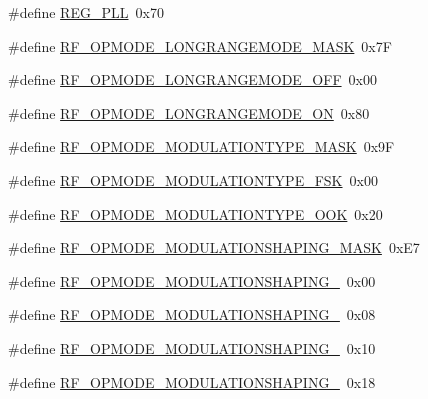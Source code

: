 \begin{DoxyCompactItemize}
\#define \mbox{\hyperlink{sx1276_regs-_fsk_8h_aa5110ddd4aaa720908be259b5a4af489}{R\+E\+G\+\_\+\+P\+LL}}~0x70
\item 
\#define \mbox{\hyperlink{sx1276_regs-_fsk_8h_afd99a116c626b5579054d37c640e175a}{R\+F\+\_\+\+O\+P\+M\+O\+D\+E\+\_\+\+L\+O\+N\+G\+R\+A\+N\+G\+E\+M\+O\+D\+E\+\_\+\+M\+A\+SK}}~0x7F
\item 
\#define \mbox{\hyperlink{sx1276_regs-_fsk_8h_a856e634d884238e300fdf87a2557d670}{R\+F\+\_\+\+O\+P\+M\+O\+D\+E\+\_\+\+L\+O\+N\+G\+R\+A\+N\+G\+E\+M\+O\+D\+E\+\_\+\+O\+FF}}~0x00
\item 
\#define \mbox{\hyperlink{sx1276_regs-_fsk_8h_a1775751bd57cbba5d752ebf2e03c6e1b}{R\+F\+\_\+\+O\+P\+M\+O\+D\+E\+\_\+\+L\+O\+N\+G\+R\+A\+N\+G\+E\+M\+O\+D\+E\+\_\+\+ON}}~0x80
\item 
\#define \mbox{\hyperlink{sx1276_regs-_fsk_8h_a9b3d405d931ad505308b89d2fa029dbb}{R\+F\+\_\+\+O\+P\+M\+O\+D\+E\+\_\+\+M\+O\+D\+U\+L\+A\+T\+I\+O\+N\+T\+Y\+P\+E\+\_\+\+M\+A\+SK}}~0x9F
\item 
\#define \mbox{\hyperlink{sx1276_regs-_fsk_8h_af4f3f4b19fd43491f270fcee634edd13}{R\+F\+\_\+\+O\+P\+M\+O\+D\+E\+\_\+\+M\+O\+D\+U\+L\+A\+T\+I\+O\+N\+T\+Y\+P\+E\+\_\+\+F\+SK}}~0x00
\item 
\#define \mbox{\hyperlink{sx1276_regs-_fsk_8h_af6fe2f62d8ec55fcf40c73ae24bc54ae}{R\+F\+\_\+\+O\+P\+M\+O\+D\+E\+\_\+\+M\+O\+D\+U\+L\+A\+T\+I\+O\+N\+T\+Y\+P\+E\+\_\+\+O\+OK}}~0x20
\item 
\#define \mbox{\hyperlink{sx1276_regs-_fsk_8h_a1b851bfa8cc641cd5a2a0805df4f4762}{R\+F\+\_\+\+O\+P\+M\+O\+D\+E\+\_\+\+M\+O\+D\+U\+L\+A\+T\+I\+O\+N\+S\+H\+A\+P\+I\+N\+G\+\_\+\+M\+A\+SK}}~0x\+E7
\item 
\#define \mbox{\hyperlink{sx1276_regs-_fsk_8h_a1a589ce58d8c5fb2da244d4829d11a3f}{R\+F\+\_\+\+O\+P\+M\+O\+D\+E\+\_\+\+M\+O\+D\+U\+L\+A\+T\+I\+O\+N\+S\+H\+A\+P\+I\+N\+G\+\_}}~0x00
\item 
\#define \mbox{\hyperlink{sx1276_regs-_fsk_8h_a19fca1c14eed0e9a8879aaef7a27e05f}{R\+F\+\_\+\+O\+P\+M\+O\+D\+E\+\_\+\+M\+O\+D\+U\+L\+A\+T\+I\+O\+N\+S\+H\+A\+P\+I\+N\+G\+\_}}~0x08
\item 
\#define \mbox{\hyperlink{sx1276_regs-_fsk_8h_a07bd0112f429ed1340afabbb6d511da3}{R\+F\+\_\+\+O\+P\+M\+O\+D\+E\+\_\+\+M\+O\+D\+U\+L\+A\+T\+I\+O\+N\+S\+H\+A\+P\+I\+N\+G\+\_}}~0x10
\item 
\#define \mbox{\hyperlink{sx1276_regs-_fsk_8h_a9f1f93b87462b90bcbccba6a26400c89}{R\+F\+\_\+\+O\+P\+M\+O\+D\+E\+\_\+\+M\+O\+D\+U\+L\+A\+T\+I\+O\+N\+S\+H\+A\+P\+I\+N\+G\+\_}}~0x18

\end{DoxyCompactItemize}
